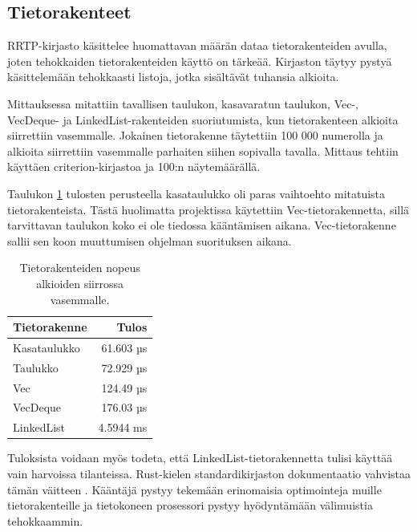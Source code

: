 \documentclass[a4paper,12pt]{article}
\begin{document}
    \subsection{Tietorakenteet}\label{sec:structures}
    RRTP-kirjasto käsittelee huomattavan määrän dataa tietorakenteiden avulla, joten tehokkaiden tietorakenteiden käyttö on tärkeää. Kirjaston täytyy pystyä käsittelemään tehokkaasti listoja, jotka sisältävät tuhansia alkioita. \par
    Mittauksessa mitattiin tavallisen taulukon, kasavaratun taulukon,
    Vec-, VecDeque- ja LinkedList-rakenteiden suoriutumista, kun tietorakenteen alkioita siirrettiin vasemmalle. Jokainen tietorakenne täytettiin 100 000 numerolla ja alkioita siirrettiin vasemmalle parhaiten siihen  sopivalla tavalla.
    Mittaus tehtiin käyttäen criterion-kirjastoa ja 100:n näytemäärällä.

    Taulukon \ref{tab:collection_bench} tulosten perusteella kasataulukko oli paras vaihtoehto mitatuista tietorakenteista. Tästä huolimatta projektissa käytettiin Vec-tietorakennetta, sillä tarvittavan taulukon koko ei ole tiedossa kääntämisen aikana. Vec-tietorakenne sallii sen koon muuttumisen ohjelman suorituksen aikana. 

    \begin{table}[h!]
        \centering
        \begin{tabularx}{\textwidth}{|X|r|}
        \hline
            \textbf{Tietorakenne} & \textbf{Tulos}     \\ \hline
            Kasataulukko & 61.603 µs \\ \hline
            Taulukko     & 72.929 µs \\ \hline
            Vec          & 124.49 µs \\ \hline
            VecDeque     & 176.03 µs \\ \hline
            LinkedList   & 4.5944 ms \\ \hline
        \end{tabularx}
        \caption{Tietorakenteiden nopeus alkioiden siirrossa vasemmalle.}
        \label{tab:collection_bench}
    \end{table}

    Tuloksista voidaan myös todeta, että LinkedList-tietorakennetta tulisi käyttää vain harvoissa tilanteissa. Rust-kielen standardikirjaston dokumentaatio vahvistaa tämän väitteen \cite[\textit{LinkedList}]{rust-std}. Kääntäjä pystyy tekemään erinomaisia optimointeja muille tietorakenteille ja tietokoneen prosessori pystyy hyödyntämään välimuistia tehokkaammin.
\end{document}

